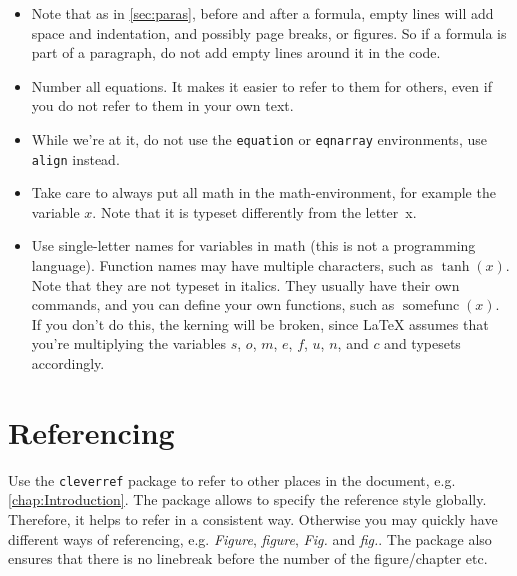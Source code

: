\documentclass[12pt, %
a4paper, %
twoside, %
openright, %
abstract=on, %
DIV=11,      %
BCOR=8mm]{scrbook} %
\DeclareMathOperator*{\somefunc}{somefunc}
\begin{document}
    \begin{itemize}
        \item
    Note that  as in \cref{sec:paras},  before and after a  formula, empty 
    lines will  add space  and indentation, and  possibly page  breaks, or 
    figures.  So  if a formula  is part of a  paragraph, do not  add empty 
    lines around it in the code.                                           

        \item
    Number all equations.  It makes it  easier to refer to them for others,
    even if you do not refer to them in your own text.

        \item
    While we're at  it, do not use the  \verb+equation+ or \verb+eqnarray+ 
    environments, use \verb+align+ instead.

        \item
    Take care to always put all  math in the math-environment, for example 
    the  variable $x$.   Note  that  it is  typeset  differently from  the 
    letter~x.

        \item
    Use  single-letter  names  for  variables   in  math  (this  is  not  a
    programming language).   Function names  may have  multiple characters,
    such as $\tanh(x)$.  Note that they are not typeset in italics.  
    They  usually have  their own  commands, and  you can  define your  own
    functions, such as  $\somefunc(x)$.  If you don't do  this, the kerning
    will  be broken,  since \LaTeX{}  assumes that  you're multiplying  the
    variables  $s$, $o$,  $m$, $e$,  $f$, $u$,  $n$, and  $c$ and  typesets
    accordingly.

    \end{itemize}

    \section{Referencing}
    Use  the \verb+cleverref+  package to  refer  to other  places in  the 
    document,  e.g.  \cref{chap:Introduction}.    The  package  allows  to 
    specify the reference style globally.  Therefore, it helps to refer in 
    a consistent  way.  Otherwise you  may quickly have different  ways of 
    referencing,   e.g.  \emph{Figure},   \emph{figure},  \emph{Fig.}   and
    \emph{fig.}.   The package  also ensures  that there  is no  linebreak 
    before the number of the figure/chapter etc.                           
\end{document}
